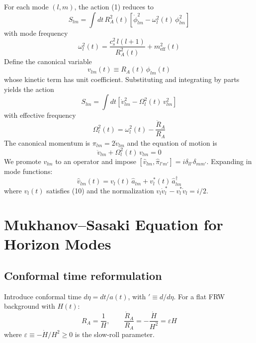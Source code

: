\documentclass[12pt,a4paper]{article}
\begin{document}
For each mode $(l, m)$, the action (1) reduces to
\begin{equation}
S_{lm} = \int dt\, R_A^2(t)\left[\dot{\phi}_{lm}^2 - \omega_l^2(t)\,\phi_{lm}^2\right] \tag{5}
\end{equation}
with mode frequency
\begin{equation}
\omega_l^2(t) = \frac{c_s^2\,l(l+1)}{R_A^2(t)} + m_\text{eff}^2(t) \tag{6}
\end{equation}
Define the canonical variable
\begin{equation}
v_{lm}(t) \equiv R_A(t)\,\phi_{lm}(t) \tag{7}
\end{equation}
whose kinetic term has unit coefficient. Substituting and integrating by parts yields the action
\begin{equation}
S_{lm} = \int dt\left[\dot{v}_{lm}^2 - \Omega_l^2(t)\,v_{lm}^2\right] \tag{8}
\end{equation}
with effective frequency
\begin{equation}
\Omega_l^2(t) = \omega_l^2(t) - \frac{\ddot{R}_A}{R_A} \tag{9}
\end{equation}
The canonical momentum is $\pi_{lm} = 2\dot{v}_{lm}$ and the equation of motion is
\begin{equation}
\ddot{v}_{lm} + \Omega_l^2(t)\,v_{lm} = 0 \tag{10}
\end{equation}
We promote $v_{lm}$ to an operator and impose $[\hat{v}_{lm}, \hat{\pi}_{l'm'}] = i\delta_{ll'}\delta_{mm'}$. Expanding in mode functions:
\begin{equation}
\hat{v}_{lm}(t) = v_l^{\,}(t)\,\hat{a}_{lm} + v_l^*(t)\,\hat{a}_{lm}^\dagger \tag{11}
\end{equation}
where $v_l(t)$ satisfies (10) and the normalization $v_l \dot{v}_l^* - v_l^* \dot{v}_l = i/2$.

\section{Mukhanov--Sasaki Equation for Horizon Modes}

\subsection{Conformal time reformulation}

Introduce conformal time $d\eta = dt/a(t)$, with $' \equiv d/d\eta$. For a flat FRW background with $H(t)$:
\begin{equation}
R_A = \frac{1}{H}, \qquad \frac{\dot{R}_A}{R_A} = -\frac{\dot{H}}{H^2} = \varepsilon H \tag{12}
\end{equation}
where $\varepsilon \equiv -\dot{H}/H^2 \geq 0$ is the slow-roll parameter.
\end{document}
